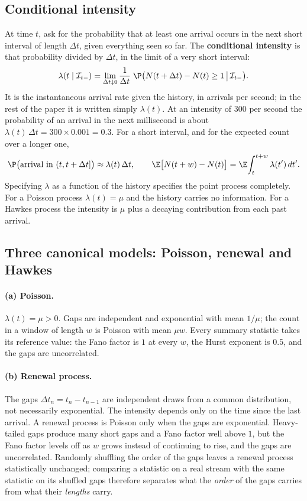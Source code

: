 \subsection{Conditional intensity}
\label{app:pp-intensity}

At time $t$, ask for the probability that at least one arrival occurs in the next short interval of
length $\Delta t$, given everything seen so far. The \textbf{conditional intensity} is that
probability divided by $\Delta t$, in the limit of a very short interval:
\[
  \lambda(t \mid \mathcal{I}_{t-}) = \lim_{\Delta t \downarrow 0} \frac{1}{\Delta t}\;
  \P\big( N(t + \Delta t) - N(t) \ge 1 \,\big|\, \mathcal{I}_{t-} \big).
\]
It is the instantaneous arrival rate given the history, in arrivals per second; in the rest of the
paper it is written simply $\lambda(t)$. At an intensity of $300$ per second the probability of an
arrival in the next millisecond is about $\lambda(t)\,\Delta t = 300 \times 0.001 = 0.3$. For a short
interval, and for the expected count over a longer one,
\[
  \P\big(\text{arrival in } (t, t+\Delta t]\big) \approx \lambda(t)\, \Delta t, \qquad
  \E\big[N(t+w) - N(t)\big] = \E\!\int_{t}^{t+w} \lambda(t')\, dt'.
\]
Specifying $\lambda$ as a function of the history specifies the point process completely. For a
Poisson process $\lambda(t) = \mu$ and the history carries no information. For a Hawkes process the
intensity is $\mu$ plus a decaying contribution from each past arrival.

\subsection{Three canonical models: Poisson, renewal and Hawkes}
\label{app:pp-canon}

\paragraph{(a) Poisson.} $\lambda(t) = \mu > 0$. Gaps are independent and exponential with mean
$1/\mu$; the count in a window of length $w$ is Poisson with mean $\mu w$. Every summary statistic
takes its reference value: the Fano factor is $1$ at every $w$, the Hurst exponent is $0.5$, and the
gaps are uncorrelated.

\paragraph{(b) Renewal process.} The gaps $\Delta t_n = t_n - t_{n-1}$ are independent draws from a common
distribution, not necessarily exponential. The intensity depends only on the time since the last
arrival. A renewal process is Poisson only when the gaps are exponential. Heavy-tailed gaps produce
many short gaps and a Fano factor well above $1$, but the Fano factor levels off as $w$ grows instead
of continuing to rise, and the gaps are uncorrelated. Randomly shuffling the order of the gaps leaves
a renewal process statistically unchanged; comparing a statistic on a real stream with the same
statistic on its shuffled gaps therefore separates what the \emph{order} of the gaps carries from
what their \emph{lengths} carry.

